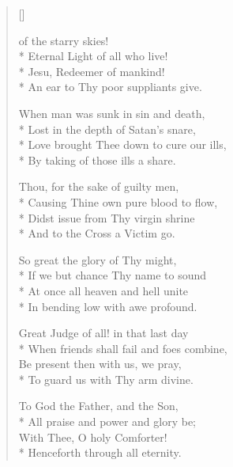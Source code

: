 \newHymn
{}

\settowidth{\versewidth}{An ear to Thy poor suppliants give}

\begin{verse}[\versewidth]
\begin{altverse}
 of the starry skies!\\*
Eternal Light of all who live!\\*
Jesu, Redeemer of mankind!\\*
An ear to Thy poor suppliants give.
\end{altverse}
\pointorig

\begin{altverse}
 When man was sunk in sin and death,\\*
Lost in the depth of Satan's snare,\\*
Love brought Thee down to cure our ills,\\*
By taking of those ills a share.
\end{altverse}

\begin{altverse}
 Thou, for the sake of guilty men,\\*
Causing Thine own pure blood to flow,\\*
Didst issue from Thy virgin shrine\\*
And to the Cross a Victim go.
\end{altverse}

\begin{altverse}
 So great the glory of Thy might,\\*
If we but chance Thy name to sound\\*
At once all heaven and hell unite\\*
In bending low with awe profound.
\end{altverse}

\begin{altverse}
 Great Judge of all! in that last day\\*
When friends shall fail and foes combine,\\
Be present then with us, we pray,\\*
To guard us with Thy arm divine.
\end{altverse}

\begin{altverse}
To God the Father, and the Son,\\*
All praise and power and glory be;\\
With Thee, O holy Comforter!\\*
Henceforth through all eternity.
\end{altverse}



\end{verse}

